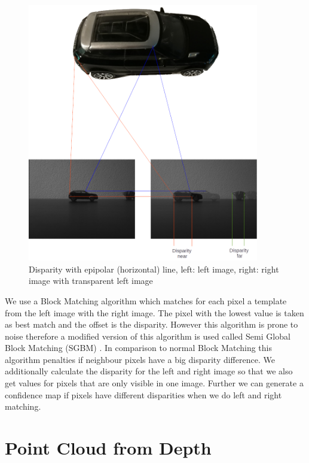 \documentclass[11pt,a4paper,titlepage,oneside]{report}
\begin{document}
\begin{figure}[H]
  \begin{center}
		\includegraphics[width=0.9\textwidth]{img/disparity_concept.png}
  \end{center}
	\caption{Disparity with epipolar (horizontal) line, left: left image, right: right image with transparent left image}\label{fig:disparity}
\end{figure}

We use a Block Matching algorithm which matches for each pixel a template from the left image with the right image. The pixel with the lowest value is taken as best match and the offset is the disparity. However this algorithm is prone to noise therefore a modified version of this algorithm is used called Semi Global Block Matching (SGBM) \cite{sgbm}. In comparison to normal Block Matching this algorithm penalties if neighbour pixels have a big disparity difference. We additionally calculate the disparity for the left and right image so that we also get values for pixels that are only visible in one image. Further we can generate a confidence map if pixels have different disparities when we do left and right matching.

\section{Point Cloud from Depth}
\end{document}

